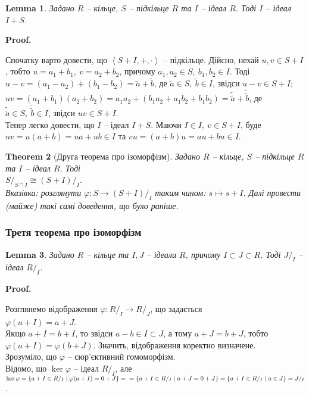 \documentclass[a4paper, 10pt]{article}
\makeatletter
\theoremstyle{theoremdd}
\newtheorem{theorem}{Theorem}[subsection]
\theoremstyle{theoremdd}
\theoremstyle{theoremdd}
\theoremstyle{theoremdd}
\theoremstyle{theoremdd}
\theoremstyle{theoremdd}
\theoremstyle{theoremdd}
\theoremstyle{theoremdd}
\theoremstyle{theoremdd}
\theoremstyle{theoremdd}
\theoremstyle{theoremdd}
\theoremstyle{theoremdd}
\theoremstyle{theoremdd}
\newtheorem{lemma}[theorem]{Lemma}
\theoremstyle{theoremdd}
\theoremstyle{theoremdd}
\renewenvironment{proof}[1][Proof.\\]{\par
\pushQED{\hfill \qed}%
\normalfont \topsep6\p@\@plus6\p@\relax
\trivlist
\item\relax
{\bfseries
#1\@addpunct{.}}\hspace\labelsep\ignorespaces
}{%
\popQED\endtrivlist\@endpefalse
}
\makeatother
\begin{document}
\begin{lemma}
Задано $R$ -- кільце, $S$ -- підкільце $R$ та $I$ -- ідеал $R$. Тоді $I$ -- ідеал $I+S$.
\end{lemma}

\begin{proof}
Спочатку варто довести, що $\left< S+I,+,\cdot \right>$ -- підкільце. Дійсно, нехай $u,v \in S+I$, тобто $u = a_1+b_1,\ v = a_2+b_2$, причому $a_1,a_2 \in S,\ b_1,b_2 \in I$. Тоді\\
$u - v = (a_1 - a_2) + (b_1 - b_2) = \tilde{a} + \tilde{b}$, де $\tilde{a} \in S,\ \tilde{b} \in I$, звідси $u - v \in S + I$;\\
$uv = (a_1+b_1)(a_2+b_2) = a_1a_2 + (b_1a_2 + a_1b_2 + b_1b_2) = \tilde{\tilde{a}} + \tilde{\tilde{b}}$, де $\tilde{\tilde{a}} \in S,\ \tilde{\tilde{b}} \in I$, звідси $uv \in S + I$.\\
Тепер легко довести, що $I$ -- ідеал $I+S$. Маючи $I \in I,\ v \in S+I$, буде $uv = u(a+b) = ua + ub \in I$ та $vu = (a+b)u = au + bu \in I$.
\end{proof}

\begin{theorem}[Друга теорема про ізоморфізм]
Задано $R$ -- кільце, $S$ -- підкільце $R$ та $I$ -- ідеал $R$. Тоді\\
$S/_{S \cap I} \cong (S+I)/_{I}$.\\
\textit{Вказівка: розглянути $\varphi \colon S \to (S+I)/_I$ таким чином: $s \mapsto s+I$. Далі провести (майже) такі самі доведення, що було раніше.}
\end{theorem}

\subsubsection{Третя теорема про ізоморфізм}
\begin{lemma}
Задано $R$ -- кільце та $I,J$ -- ідеали $R$, причому $I \subset J \subset R$. Тоді $J/_I$ -- ідеал $R/_I$.
\end{lemma}

\begin{proof}
Розглянемо відображення $\varphi \colon R/_I \to R/_J$, що задається\\
$\varphi(a+I) = a+J$.\\
Якщо $a+I = b+I$, то звідси $a-b \in I \subset J$, а тому $a+J = b+J$, тобто $\varphi(a+I) = \varphi(b+J)$. Значить, відображення коректно визначене.\\
Зрозуміло, що $\varphi$ -- сюр'єктивний гомоморфізм. \\
Відомо, що $\ker \varphi$ -- ідеал $R/_I$, але\\
$\ker \varphi = \{a + I \in R/_I \mid \varphi(a+I) = 0+J\} = \\
= \{a+I \in R/_I \mid a+J = 0+J\} = \{a+I \in R/_I \mid a \in J\} = J/_I$.
\end{proof}
\end{document}
